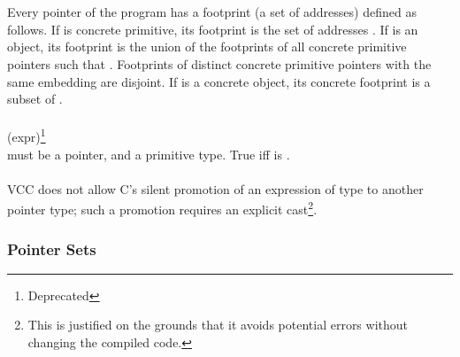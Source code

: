 \documentclass[preprint,nocopyrightspace]{sigplanconf}
\begin{document}
{{\\\\
Every pointer of the program has a footprint (a set of addresses)
defined as follows.  If  is concrete primitive, its footprint
is the set of addresses
\vcc{[\addr(p),\addr(p) + \sizeof_object(p))}.
If  is an object, its footprint is the union of
the footprints of all concrete primitive pointers 
 such that . 
Footprints of distinct concrete primitive pointers with the same
embedding are disjoint.  If  is a concrete object, its concrete
footprint is a subset of 
\vcc{[\addr(p),\addr(p) + \sizeof_object(p))}.
\\\\
 (expr)\footnote{Deprecated}\\
 must be a pointer, and  a primitive type. 
True iff  is .
\\\\
VCC does not allow C's silent promotion of an expression of
type  to another pointer type; such a promotion requires
an explicit cast\footnote{This is justified on the grounds that it avoids
potential errors without changing the compiled code.}.

\subsubsection{Pointer Sets}

}}
\end{document}
